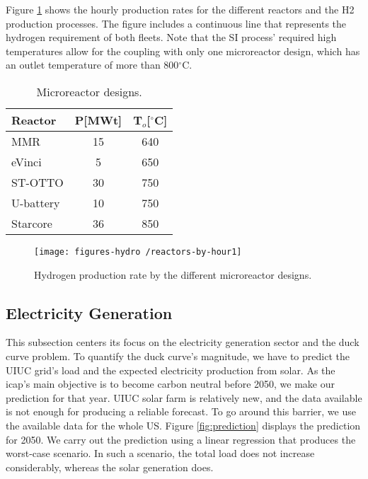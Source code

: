 \documentclass[11pt,letterpaper]{article}
\begin{document}
Figure \ref{fig:hydro-micro} shows the hourly production rates for the different reactors and the \gls{H2} production processes.
The figure includes a continuous line that represents the hydrogen requirement of both fleets.
Note that the \gls{SI} process' required high temperatures allow for the coupling with only one microreactor design, which has an outlet temperature of more than 800$^{\circ}$C.

	\begin{table}[htbp!]
		\centering
	    \caption{Microreactor designs.}
		\begin{tabular}{l|cc}
		\hline
		Reactor                                      & P[MWt] & T$_o$[$^\circ$C] \\ \hline
		MMR \cite{usnc_mmr_2019}  		             & 15           & 640              \\
		eVinci \cite{hernandez_micro_2019}           & 5            & 650              \\
		ST-OTTO \cite{harlan_x-energy_2018}          & 30           & 750              \\
		U-battery \cite{ding_design_2011}            & 10           & 750              \\
		Starcore \cite{star_core_nuclear_star_2015}  & 36           & 850              \\ \hline
        \end{tabular}
        \label{tab:hydro-micro}
	\end{table}

	\begin{figure}[htbp!]
	    \centering
		\texttt{[image: figures-hydro /reactors-by-hour1]}
		\hfill
		\caption{Hydrogen production rate by the different microreactor designs.}
		\label{fig:hydro-micro}
	\end{figure}

\subsection{Electricity Generation}

This subsection centers its focus on the electricity generation sector and the duck curve problem.
To quantify the duck curve's magnitude, we have to predict the \gls{UIUC} grid's load and the expected electricity production from solar. 
As the \gls{icap}'s main objective is to become carbon neutral before 2050, we make our prediction for that year.
\gls{UIUC} solar farm is relatively new, and the data available is not enough for producing a reliable forecast.
To go around this barrier, we use the available data for the whole \gls{US}.
Figure \ref{fig:prediction} displays the prediction for 2050.
We carry out the prediction using a linear regression that produces the worst-case scenario.
In such a scenario, the total load does not increase considerably, whereas the solar generation does.
\end{document}
